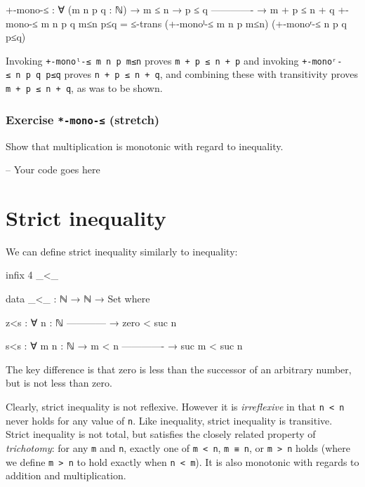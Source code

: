 \begin{fence}
\begin{code}
+-mono-≤ : ∀ (m n p q : ℕ)
  → m ≤ n
  → p ≤ q
    -------------
  → m + p ≤ n + q
+-mono-≤ m n p q m≤n p≤q  =  ≤-trans (+-monoˡ-≤ m n p m≤n) (+-monoʳ-≤ n p q p≤q)
\end{code}
\end{fence}

Invoking \texttt{+-monoˡ-≤\ m\ n\ p\ m≤n} proves
\texttt{m\ +\ p\ ≤\ n\ +\ p} and invoking
\texttt{+-monoʳ-≤\ n\ p\ q\ p≤q} proves \texttt{n\ +\ p\ ≤\ n\ +\ q},
and combining these with transitivity proves
\texttt{m\ +\ p\ ≤\ n\ +\ q}, as was to be shown.

\hypertarget{exercise--mono--stretch}{%
\subsubsection{\texorpdfstring{Exercise \texttt{*-mono-≤}
(stretch)}{Exercise *-mono-≤ (stretch)}}\label{exercise--mono--stretch}}

Show that multiplication is monotonic with regard to inequality.

\begin{fence}
\begin{code}
-- Your code goes here
\end{code}
\end{fence}

\hypertarget{Relations-strict-inequality}{%
\section{Strict inequality}\label{Relations-strict-inequality}}

We can define strict inequality similarly to inequality:

\begin{fence}
\begin{code}
infix 4 _<_

data _<_ : ℕ → ℕ → Set where

  z<s : ∀ {n : ℕ}
      ------------
    → zero < suc n

  s<s : ∀ {m n : ℕ}
    → m < n
      -------------
    → suc m < suc n
\end{code}
\end{fence}

The key difference is that zero is less than the successor of an
arbitrary number, but is not less than zero.

Clearly, strict inequality is not reflexive. However it is
\emph{irreflexive} in that \texttt{n\ \textless{}\ n} never holds for
any value of \texttt{n}. Like inequality, strict inequality is
transitive. Strict inequality is not total, but satisfies the closely
related property of \emph{trichotomy}: for any \texttt{m} and
\texttt{n}, exactly one of \texttt{m\ \textless{}\ n}, \texttt{m\ ≡\ n},
or \texttt{m\ \textgreater{}\ n} holds (where we define
\texttt{m\ \textgreater{}\ n} to hold exactly when
\texttt{n\ \textless{}\ m}). It is also monotonic with regards to
addition and multiplication.


